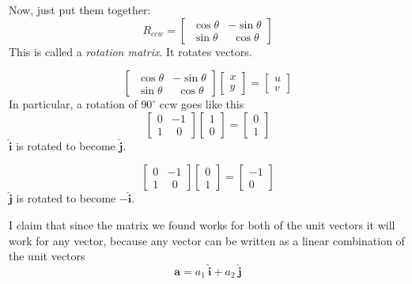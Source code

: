 \documentclass[11pt, oneside]{article}
\begin{document}
Now, just put them together:
\[
R_{ccw} = 
\begin{bmatrix}   \ \cos \theta & -\sin \theta  \\  \ \sin \theta & \ \ \cos \theta  \end{bmatrix}
\]
This is called a \emph{rotation matrix}.  It rotates vectors.

\[
\begin{bmatrix}   \ \cos \theta & -\sin \theta  \\  \ \sin \theta & \ \ \cos \theta  \end{bmatrix}
\begin{bmatrix}   x   \\  y  \end{bmatrix} = \begin{bmatrix}   u   \\  v  \end{bmatrix}
\]
In particular, a rotation of $90^{\circ}$ ccw goes like this
\[
\begin{bmatrix}   0 & -1  \\  1 & \ \ 0  \end{bmatrix}
\begin{bmatrix}   1   \\  0  \end{bmatrix} = \begin{bmatrix}   0   \\  1  \end{bmatrix}
\]
$\hat{\mathbf{i}}$ is rotated to become $\hat{\mathbf{j}}$.

\[
\begin{bmatrix}   0 & -1  \\  1 & \ \ 0  \end{bmatrix}
\begin{bmatrix}   0   \\  1  \end{bmatrix} = \begin{bmatrix}   -1   \\  0  \end{bmatrix}
\]
$\hat{\mathbf{j}}$ is rotated to become $-\hat{\mathbf{i}}$.

I claim that since the matrix we found works for both of the unit vectors it will work for any vector, because any vector can be written as a linear combination of the unit vectors
\[ \mathbf{a} = a_1 \ \hat{\mathbf{i}} + a_2 \ \hat{\mathbf{j}} \]
\end{document}
